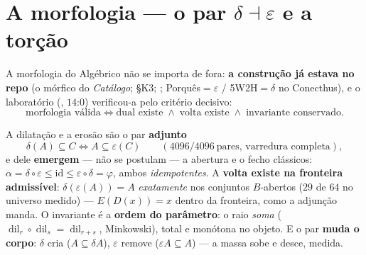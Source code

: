 \documentclass[livro.tex]{subfiles}
\begin{document}
\section{A morfologia --- o par $\delta\dashv\varepsilon$ e a torção}\label{sec:morfologia}

A morfologia do Algébrico não se importa de fora: \textbf{a construção
já estava no repo} (o mórfico do \emph{Catálogo}; 
\S K3; ; Porquês${}=\varepsilon$ /
5W2H${}=\delta$ no Conecthus), e o laboratório
(, $14$:$0$) verificou-a pelo
critério decisivo:
\[
\boxed{
\text{morfologia válida}
\iff
\text{dual existe}\;\land\;\text{volta existe}\;\land\;\text{invariante conservado}.
}
\]

\begin{teorema}\label{thm:morf-par}
A dilatação e a erosão são o par \textbf{adjunto}
\[
\boxed{\delta(A)\subseteq C\iff A\subseteq\varepsilon(C)}
\qquad(4096/4096\ \text{pares, varredura completa}),
\]
e dele \textbf{emergem} --- não se postulam --- a abertura e o fecho
clássicos: $\alpha=\delta\circ\varepsilon\le\mathrm{id}\le
\varepsilon\circ\delta=\varphi$, ambos \emph{idempotentes}. A
\textbf{volta existe na fronteira admissível}:
$\delta(\varepsilon(A))=A$ \emph{exatamente} nos conjuntos
$B$-abertos ($29$ de $64$ no universo medido) --- $E(D(x))=x$ dentro
da fronteira, como a adjunção manda. O invariante é a \textbf{ordem do
parâmetro}: o raio \emph{soma}
($\operatorname{dil}_r\circ\operatorname{dil}_s=\operatorname{dil}_{r+s}$,
Minkowski), total e monótona no objeto. E o par \textbf{muda o corpo}:
$\delta$ cria ($A\subseteq\delta A$), $\varepsilon$ remove
($\varepsilon A\subseteq A$) --- a massa sobe e desce, medida.
\end{teorema}
\end{document}
